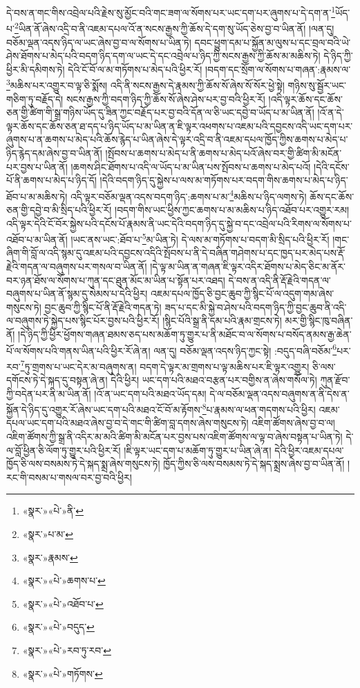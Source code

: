 དེ་བས་ན་གང་གིས་འབྲེལ་པའི་རྗེས་སུ་མྱོང་བའི་གང་ཟག་ལ་སོགས་པར་ཡང་དག་པར་ཞུགས་པ་དེ་དག་ན་\footnote{«སྣར་»«པེ་»ནི་}ཡོད་པ་\footnote{«སྣར་»པ་མ་}ཡིན་ནོ་ཞེས་འདྲི་བ་ནི་འཇམ་དཔལ་འོ་ན་སངས་རྒྱས་ཀྱི་ཆོས་དེ་དག་སུ་ཡོད་ཅེས་བྱ་བ་ཡིན་ནོ། །ལན་དུ། བཅོམ་ལྡན་འདས་ཉིད་ལ་ཡང་ཞེས་བྱ་བ་ལ་སོགས་པ་ཡིན་ཏེ། དབང་ཕྱུག་དམ་པ་སྐྱོན་མ་ལུས་པ་དང་བྲལ་བའི་ཡེ་ཤེས་ཐོགས་པ་མེད་པའི་བདག་ཉིད་དག་ལ་ཡང་དེ་དང་འབྲེལ་པ་ཉིད་ཀྱི་སངས་རྒྱས་ཀྱི་ཆོས་མ་མཆིས་ཏེ། དེ་ཉིད་ཀྱི་ཕྱིར་མི་དམིགས་ཏེ། དེའི་ངོ་བོ་ལ་མ་གཏོགས་པ་མེད་པའི་ཕྱིར་རོ། །བདག་དང་སྲོག་ལ་སོགས་པ་གཞན་:རྣམས་ལ་\footnote{«སྣར་»རྣམས་}མཆིས་པར་འགྱུར་བ་ལྟ་ཅི་སྨོས། འདི་ནི་སངས་རྒྱས་དེ་རྣམས་ཀྱི་ཆོས་སོ་ཞེས་སོ་སོར་ཕྱེ་སྟེ། གཉིས་སུ་སྦྱོར་ཡང་གཅིག་ཏུ་བརྗོད་དེ། སངས་རྒྱས་ཀྱི་བདག་ཉིད་ཀྱི་ཆོས་སོ་ཞེས་ཤེས་པར་བྱ་བའི་ཕྱིར་རོ། །འདི་ལྟར་ཆོས་དང་ཆོས་ཅན་གྱི་ཚིག་གི་སྒྲ་གཉིས་ཡོད་དུ་ཟིན་ཀྱང་བརྗོད་པར་བྱ་བའི་དོན་ལ་ཅི་ཡང་དབྱེ་བ་ཡོད་པ་མ་ཡིན་ནོ། །འོ་ན་དེ་ལྟར་ཆོས་དང་ཆོས་ཅན་ཐ་དད་པ་ཉིད་ཡོད་པ་མ་ཡིན་ན་ཇི་ལྟར་འཕགས་པ་འཇམ་པའི་དབྱངས་འདི་ཡང་དག་པར་ཞུགས་པ་ན་ཆགས་པ་མེད་པའི་ཆོས་རྙེད་པ་ཡིན་ཞེས་དེ་ལྟར་འདྲི་བ་ནི་འཇམ་དཔལ་ཁྱོད་ཀྱིས་ཆགས་པ་མེད་པ་ཉིད་རྙེད་དམ་ཞེས་བྱ་བ་ཡིན་ནོ། །སྤོབས་པ་ཆགས་པ་མེད་པ་ནི་ཆགས་པ་མེད་པའོ་ཞེས་བར་གྱི་ཚིག་མི་མངོན་པར་བྱས་པ་ཡིན་ནོ། །ཆགས་ཤིང་ཐོགས་པ་འདི་ལ་ཡོད་པ་མ་ཡིན་པས་སྤོབས་པ་ཆགས་པ་མེད་པའོ། །དེའི་དངོས་པོ་ནི་ཆགས་པ་མེད་པ་ཉིད་དོ། །དེའི་བདག་ཉིད་དུ་སྐྱེས་པ་ལས་མ་གཏོགས་པར་བདག་གིས་ཆགས་པ་མེད་པ་ཉིད་ཐོབ་པ་མ་མཆིས་ཏེ། འདི་ལྟར་བཅོམ་ལྡན་འདས་བདག་ཉིད་:ཆགས་པ་མ་\footnote{«སྣར་»«པེ་»ཆགས་པ་}མཆིས་པ་ཉིད་ལགས་ཏེ། ཆོས་དང་ཆོས་ཅན་གྱི་དབྱེ་བ་མི་སྲིད་པའི་ཕྱིར་རོ། །བདག་གིས་ཡང་ཕྱིས་ཀྱང་ཆགས་པ་མ་མཆིས་པ་ཉིད་འཐོབ་པར་འགྱུར་རམ། འདི་ལྟར་དེའི་ངོ་བོར་སྐྱེས་པའི་དངོས་པོ་རྣམས་ནི་ཡང་དེའི་བདག་ཉིད་དུ་སྐྱེ་བ་དང་འབྲེལ་པའི་རིགས་ལ་སོགས་པ་འཐོབ་པ་མ་ཡིན་ནོ། །ཡང་ནས་ཡང་:ཐོབ་པ་\footnote{«སྣར་»«པེ་»འཐོབ་པ་}མ་ཡིན་ཏེ། དེ་ལས་མ་གཏོགས་པ་བདག་མི་སྲིད་པའི་ཕྱིར་རོ། །གང་ཞིག་གི་བློ་ལ་འདི་སྙམ་དུ་འཇམ་པའི་དབྱངས་འདིའི་སྤོབས་པ་ནི་དེ་བཞིན་གཤེགས་པ་དང་ཁྱད་པར་མེད་པས་རྡོ་རྗེའི་གདན་ལ་བཞུགས་པར་གསལ་བ་ཡིན་ནོ། །དེ་ལྟ་མ་ཡིན་ན་གཞན་ཇི་ལྟར་འདིར་ཐོགས་པ་མེད་ཅིང་མ་ནོར་བར་ཉན་ཐོས་ལ་སོགས་པ་ཀུན་དང་ཐུན་མོང་མ་ཡིན་པ་སྟོན་པར་འཐད། དེ་བས་ན་འདི་ནི་རྡོ་རྗེའི་གདན་ལ་བཞུགས་པ་ཡིན་ནོ་སྙམ་དུ་སེམས་པ་དེའི་ཕྱིར། འཇམ་དཔལ་ཁྱོད་ཅི་བྱང་ཆུབ་ཀྱི་སྙིང་པོ་ལ་འདུག་གམ་ཞེས་གསུངས་ཏེ། བྱང་ཆུབ་ཀྱི་སྙིང་པོ་ནི་རྡོ་རྗེའི་གདན་ཏེ། ཟད་པ་དང་མི་སྐྱེ་བ་ཤེས་པའི་བདག་ཉིད་ཀྱི་བྱང་ཆུབ་ནི་འདི་ལ་བཞུགས་ཏེ་སྐྱེད་པས་སྙིང་པོར་བྱས་པའི་ཕྱིར་རོ། །སྙིང་པོའི་སྒྲ་ནི་དམ་པའི་རྣམ་གྲངས་ཏེ། མར་གྱི་སྙིང་ཁུ་བཞིན་ནོ། །དེ་ཉིད་ཀྱི་ཕྱིར་ཕྱོགས་གཞན་ཐམས་ཅད་པས་མཆོག་ཏུ་གྱུར་པ་ནི་མཐོང་བ་ལ་སོགས་པ་བསོད་ནམས་རྒྱ་ཆེན་པོ་ལ་སོགས་པའི་གནས་ཡིན་པའི་ཕྱིར་རོ་ཞེ་ན། ལན་དུ། བཅོམ་ལྡན་འདས་ཉིད་ཀྱང་སྟེ། :བདུད་བཞི་བཅོམ་\footnote{«སྣར་»«པེ་»བདུད་}པར་རབ་\footnote{«སྣར་»«པེ་»རབ་ཏུ་རབ་}ཏུ་གྲགས་པ་ཡང་དེར་མ་བཞུགས་ན། བདག་དེ་ལྟར་མ་གྲགས་པ་ལྟ་མཆིས་པར་ཇི་ལྟར་འགྱུར། ཅི་ལས་དགོངས་ཏེ་དེ་སྐད་དུ་བསྟན་ཞེ་ན། དེའི་ཕྱིར། ཡང་དག་པའི་མཐའ་བརྩན་པར་བགྱིས་ན་ཞེས་གསོལ་ཏེ། ཀུན་རྫོབ་ཀྱི་བདེན་པར་ནི་མ་ཡིན་ནོ། །འོ་ན་ཡང་དག་པའི་མཐའ་ཡོད་དམ། དེ་ལ་བཅོམ་ལྡན་འདས་བཞུགས་ན་ནི་དེས་ན་སྐྱོན་དེ་ཉིད་དུ་འགྱུར་རོ་ཞེས་ཡང་དག་པའི་མཐའ་ངོ་བོ་མ་རྟོགས་\footnote{«སྣར་»«པེ་»གཏོགས་}པ་རྣམས་ལ་ཕན་གདགས་པའི་ཕྱིར། འཇམ་དཔལ་ཡང་དག་པའི་མཐའ་ཞེས་བྱ་བ་དེ་གང་གི་ཚིག་བླ་དགས་ཞེས་གསུངས་ཏེ། འཇིག་ཚོགས་ཞེས་བྱ་བ་ལ། འཇིག་ཚོགས་ཀྱི་སྒྲ་ནི་འདིར་མ་མའི་ཚིག་མི་མངོན་པར་བྱས་པས་འཇིག་ཚོགས་ལ་ལྟ་བ་ཞེས་བསྟན་པ་ཡིན་ཏེ། དེ་ལ་བློ་ཕྱིན་ཅི་ལོག་ཏུ་གྱུར་པའི་ཕྱིར་རོ། །ཇི་ལྟར་ཡང་དག་པ་མཆོག་ཏུ་གྱུར་པ་ཡིན་ཞེ་ན། དེའི་ཕྱིར་འཇམ་དཔལ་ཁྱོད་ཅི་ལས་བསམས་ཏེ་དེ་སྐད་སྨྲ་ཞེས་གསུངས་ཏེ། ཁྱོད་ཀྱིས་ཅི་ལས་བསམས་ཏེ་དེ་སྐད་སྨྲས་ཞེས་བྱ་བ་ཡིན་ནོ། །རང་གི་བསམ་པ་གསལ་བར་བྱ་བའི་ཕྱིར། 